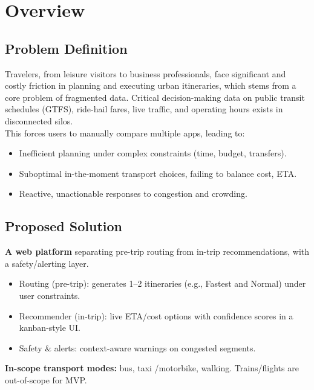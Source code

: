 \chapter{Overview}
\label{chap:overview}

\section{Problem Definition}
Travelers, from leisure visitors to business professionals, face significant and costly friction in
planning and executing urban itineraries, which stems from a core problem of fragmented data.
Critical decision-making data on public transit schedules (GTFS), ride-hail fares, live traffic, and
operating hours exists in disconnected silos. \\
This forces users to manually compare multiple apps, leading to:
\begin{itemize}
    \item Inefficient planning under complex constraints (time, budget, transfers).
    \item Suboptimal in-the-moment transport choices, failing to balance cost, ETA.
    \item Reactive, unactionable responses to congestion and crowding.
\end{itemize}
\section{Proposed Solution}
\textbf{A web platform} separating pre-trip routing from in-trip recommendations, with a safety/alerting layer.
\begin{itemize}
    \item Routing (pre-trip): generates 1–2 itineraries (e.g., Fastest and Normal) under user constraints.
    \item Recommender (in-trip): live ETA/cost options with confidence scores in a kanban-style UI.
    \item Safety $\&$ alerts: context-aware warnings on congested segments.
\end{itemize}
\textbf{In-scope transport modes:} bus, taxi /motorbike, walking. Trains/flights are out-of-scope for MVP.
